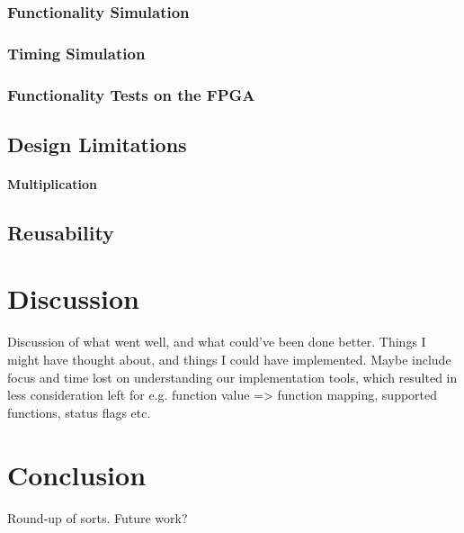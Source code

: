 \documentclass{article}
\begin{document}
\subsubsection{Functionality Simulation}
\label{subsec:funcsim}

\subsubsection{Timing Simulation}
\label{subsec:timingsim}

\subsubsection{Functionality Tests on the FPGA}
\label{subsec:funcfpga}

\subsection{Design Limitations}
\label{subsec:limitations}
\paragraph{Multiplication}

\subsection{Reusability}
\label{subsec:reusability}

\section{Discussion}
\label{sec:discussion}
Discussion of what went well, and what could've been done better. Things I might have thought about, and things I could have implemented. Maybe include focus and time lost on understanding our implementation tools, which resulted in less consideration left for e.g. function value => function mapping, supported functions, status flags etc.

\section{Conclusion}
\label{sec:conclusion}
Round-up of sorts. Future work?
\end{document}
